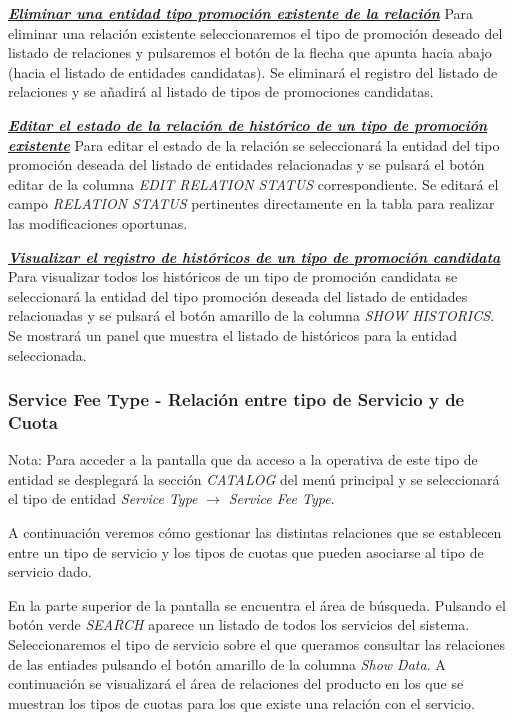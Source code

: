 \underline{\textsl{\textbf{Eliminar una entidad tipo promoción existente de la relación}}}\newline
Para eliminar una relación existente seleccionaremos el tipo de promoción deseado del listado de relaciones y pulsaremos el botón de la flecha que apunta hacia abajo (hacia el listado de entidades candidatas). Se eliminará el registro del listado de relaciones y se añadirá al listado de tipos de promociones candidatas.


\underline{\textsl{\textbf{Editar el estado de la relación de histórico de un tipo de promoción existente}}}
Para editar el estado de la relación se seleccionará la entidad del tipo promoción  deseada del listado de entidades relacionadas y se pulsará el botón editar de la columna \textit{EDIT RELATION STATUS} correspondiente. Se editará el campo \emph{RELATION STATUS}  pertinentes directamente en la tabla para realizar las modificaciones oportunas.

\underline{\textsl{\textbf{Visualizar el registro de históricos de un tipo de promoción candidata}}}
Para visualizar todos los históricos de un tipo de promoción candidata se seleccionará la entidad del tipo promoción deseada del listado de entidades relacionadas y se pulsará el botón amarillo de la columna \textit{SHOW HISTORICS}. Se mostrará un panel que muestra el listado de históricos para la entidad seleccionada. 



\subsubsection{Service Fee Type - Relación entre tipo de Servicio y de Cuota}
\label{sub:product-fee-type-relation}

Nota: Para acceder a la pantalla que da acceso a la operativa de este tipo de entidad se desplegará la sección \emph{CATALOG} del menú principal y se seleccionará el tipo de entidad \emph{Service Type} $\rightarrow$  \emph{Service Fee Type}.


A continuación veremos cómo gestionar las distintas relaciones que se establecen entre un tipo de servicio y los tipos de cuotas que pueden asociarse al tipo de servicio dado.


En la parte superior de la pantalla se encuentra el área de búsqueda. Pulsando el botón verde \emph{SEARCH} aparece un listado de todos los servicios del sistema. Seleccionaremos el tipo de servicio sobre el que queramos consultar las relaciones de las entiades pulsando el botón amarillo de la columna \emph{Show Data}. A continuación se visualizará el área de relaciones del producto en los que se muestran los tipos de cuotas para los que existe una relación con el servicio.

